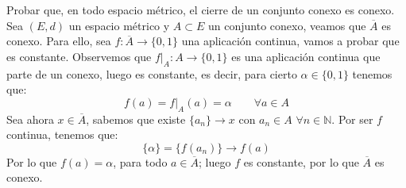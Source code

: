 \begin{ejercicio}
Probar que, en todo espacio métrico, el cierre de un conjunto conexo es conexo.\\

\noindent
Sea $(E,d)$ un espacio métrico y $A\subset E$ un conjunto conexo, veamos que $\overline{A}$ es conexo. Para ello, sea $f:\overline{A}\rightarrow \{0,1\}$ una aplicación continua, vamos a probar que es constante. Observemos que $f\big|_A :A \rightarrow \{0,1\}$ es una aplicación continua que parte de un conexo, luego es constante, es decir, para cierto $\alpha \in \{0,1\}$ tenemos que:
\begin{equation*}
    f(a) = f\big|_A(a) = \alpha \qquad \forall a\in A
\end{equation*}
Sea ahora $x\in \overline{A}$, sabemos que existe $\{a_n\}\rightarrow x$ con $a_n\in A$ $\forall n\in \mathbb{N}$. Por ser $f$ continua, tenemos que:
\begin{equation*}
    \{\alpha\} = \{f(a_n)\} \rightarrow f(a)
\end{equation*}
Por lo que $f(a) = \alpha$, para todo $a\in \overline{A}$; luego $f$ es constante, por lo que $\overline{A}$ es conexo.
\end{ejercicio}

